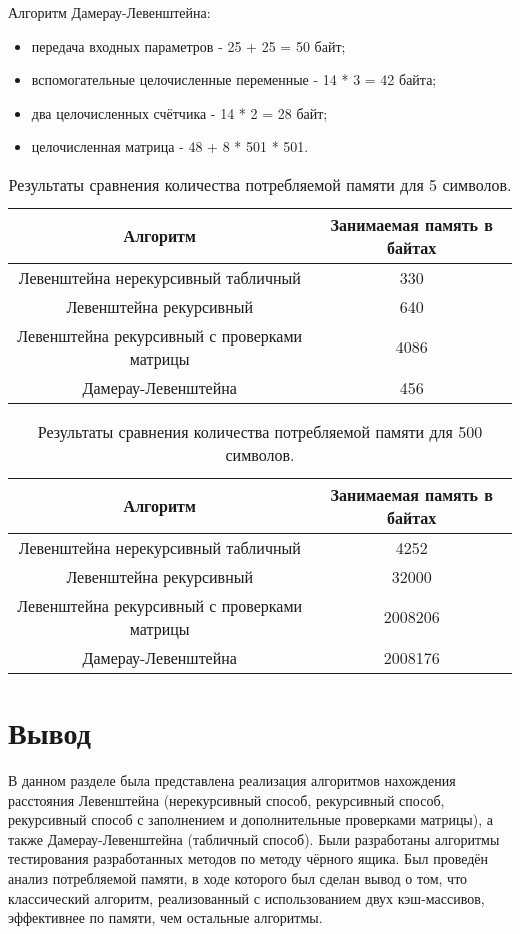 Алгоритм Дамерау-Левенштейна:
\begin{itemize}
	\item передача входных параметров - 25 + 25 = 50 байт;
	\item вспомогательные целочисленные переменные - 14 * 3 = 42 байта;
	\item два целочисленных счётчика - 14 * 2 = 28 байт;
	\item целочисленная матрица - 48 + 8 * 501 * 501.
\end{itemize}

\begin{table}[h!]
  \begin{center}
 \captionsetup{justification=raggedright}
    \caption{Результаты сравнения количества потребляемой памяти для 5 символов.}
    \label{tab:table2}
    \begin{tabular}{c|c}
      \textbf{Алгоритм} & \textbf{Занимаемая память в байтах}\\
      \hline
	Левенштейна нерекурсивный табличный & 330\\
	Левенштейна рекурсивный & 640\\
	Левенштейна рекурсивный с проверками матрицы & 4086\\
	Дамерау-Левенштейна & 456\\
    \end{tabular}
  \end{center}
\end{table}


\begin{table}[h!]
  \begin{center}
 \captionsetup{justification=raggedright}
    \caption{Результаты сравнения количества потребляемой памяти для 500 символов.}
    \label{tab:table3}
    \begin{tabular}{c|c}
      \textbf{Алгоритм} & \textbf{Занимаемая память в байтах}\\
      \hline
	Левенштейна нерекурсивный табличный & 4252\\
	Левенштейна рекурсивный & 32000\\
	Левенштейна рекурсивный с проверками матрицы & 2008206\\
	Дамерау-Левенштейна & 2008176\\
    \end{tabular}
  \end{center}
\end{table}

\section{Вывод}
В данном разделе была представлена реализация алгоритмов нахождения расстояния Левенштейна (нерекурсивный способ, рекурсивный способ, рекурсивный способ с заполнением и дополнительные проверками матрицы), а также Дамерау-Левенштейна (табличный способ). Были разработаны алгоритмы тестирования разработанных методов по методу чёрного ящика. Был проведён анализ потребляемой памяти, в ходе которого был сделан вывод о том, что классический алгоритм, реализованный с использованием двух кэш-массивов, эффективнее по памяти, чем остальные алгоритмы.

